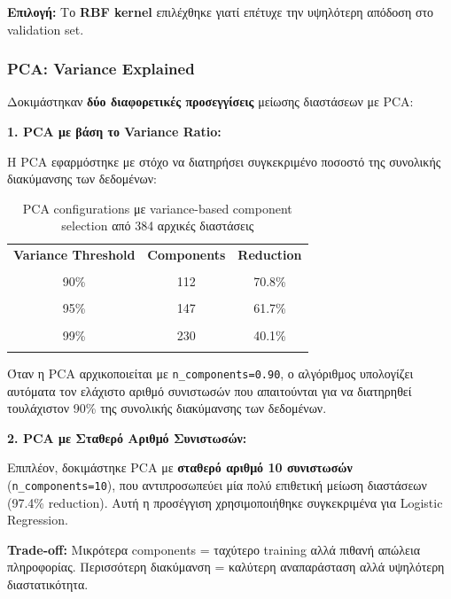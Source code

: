 \documentclass[12pt,a4paper,twoside]{book}
\begin{document}
\textbf{Επιλογή:} Το \textbf{RBF kernel} επιλέχθηκε γιατί επέτυχε την υψηλότερη απόδοση στο validation set.

\subsubsection*{PCA: Variance Explained}

Δοκιμάστηκαν \textbf{δύο διαφορετικές προσεγγίσεις} μείωσης διαστάσεων με PCA:

\textbf{1. PCA με βάση το Variance Ratio:}

Η PCA εφαρμόστηκε με στόχο να διατηρήσει συγκεκριμένο ποσοστό της συνολικής διακύμανσης των δεδομένων:

\begin{table}[h]
    \centering
    \begin{tabular}{ccc}
        \hline
        \textbf{Variance Threshold} & \textbf{Components} & \textbf{Reduction} \\\\
        \hline
        90\%                        & 112                 & 70.8\%             \\\\
        95\%                        & 147                 & 61.7\%             \\\\
        99\%                        & 230                 & 40.1\%             \\\\
        \hline
    \end{tabular}
    \caption{PCA configurations με variance-based component selection από 384 αρχικές διαστάσεις}
\end{table}

Όταν η PCA αρχικοποιείται με \texttt{n\_components=0.90}, ο αλγόριθμος υπολογίζει αυτόματα τον ελάχιστο αριθμό συνιστωσών που απαιτούνται για να διατηρηθεί τουλάχιστον 90\% της συνολικής διακύμανσης των δεδομένων.

\textbf{2. PCA με Σταθερό Αριθμό Συνιστωσών:}

Επιπλέον, δοκιμάστηκε PCA με \textbf{σταθερό αριθμό 10 συνιστωσών} (\texttt{n\_components=10}), που αντιπροσωπεύει μία πολύ επιθετική μείωση διαστάσεων (97.4\% reduction). Αυτή η προσέγγιση χρησιμοποιήθηκε συγκεκριμένα για Logistic Regression.

\textbf{Trade-off:} Μικρότερα components = ταχύτερο training αλλά πιθανή απώλεια πληροφορίας. Περισσότερη διακύμανση = καλύτερη αναπαράσταση αλλά υψηλότερη διαστατικότητα.
\end{document}
